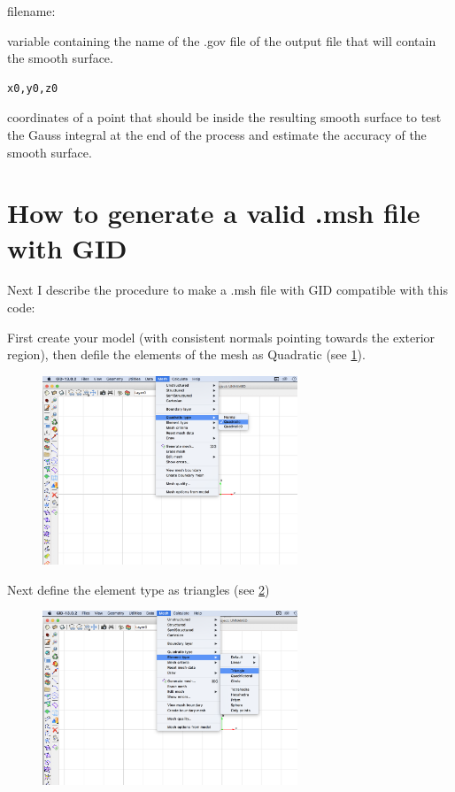 \documentclass[11pt, oneside]{article}   	%
\begin{document}
filename:
\newline
\newline

variable containing the name of the .gov file of the output file that will contain the smooth surface.

\begin{verbatim}x0,y0,z0\end{verbatim}

coordinates of a point that should be inside the resulting smooth surface to test the Gauss integral at the end of the process and estimate the accuracy of the smooth surface.


\section{How to generate a valid .msh file with GID}

Next I describe the procedure to make a .msh file with GID compatible with this code:

First create your model (with consistent normals pointing towards the exterior region), then defile the elements of the mesh as Quadratic (see \ref{GID_figure_1}).

\begin{figure}[H]
\begin{center}
\includegraphics[width=3in]{GID_figure_1.png}%
\end{center}
\caption{}
\label{GID_figure_1}
\end{figure}

Next define the element type as triangles (see \ref{GID_figure_2})

\begin{figure}[H]
\begin{center}
\includegraphics[width=3in]{GID_figure_2.png}%
\end{center}
\caption{}
\label{GID_figure_2}
\end{figure}
\end{document}
